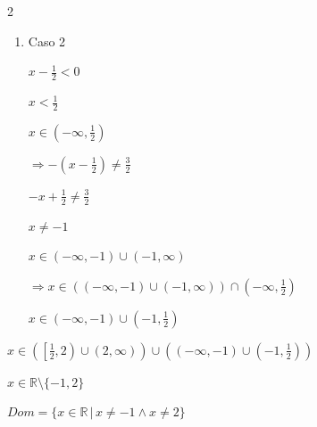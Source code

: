 \documentclass{article}
\begin{document}
\begin{enumerate}
\begin{enumerate}
\begin{multicols}{2}
\begin{enumerate}
         $x \geq \frac{1}{2}$

         $x \in \left[ \frac{1}{2}, \infty \right)$
         \vspace{\baselineskip}
         
         $\Rightarrow x - \frac{1}{2} \neq \frac{3}{2}$

         $x \neq 2$

         $x \in (-\infty, 2) \cup (2, \infty)$
         \vspace{\baselineskip}
         
         $\Rightarrow x \in \left( (-\infty, 2) \cup (2, \infty) \right) \cap \left[ \frac{1}{2}, \infty \right)$

         $x \in \left[ \frac{1}{2}, 2 \right) \cup (2, \infty)$
         \vspace{\baselineskip}
         
         \item[2.] Caso 2

         $x - \frac{1}{2} < 0$

         $x < \frac{1}{2}$

         $x \in (-\infty, \frac{1}{2})$
         \vspace{\baselineskip}

         $\Rightarrow -(x - \frac{1}{2}) \neq \frac{3}{2}$

         $-x + \frac{1}{2} \neq \frac{3}{2}$

         $x \neq -1$

         $x \in (-\infty, -1) \cup (-1, \infty)$
         \vspace{\baselineskip}
         
         $\Rightarrow x \in \left( (-\infty, -1) \cup (-1, \infty) \right) \cap (-\infty, \frac{1}{2})$

         $x \in (-\infty, -1) \cup (-1, \frac{1}{2})$
         \end{enumerate}
         \end{multicols}
         \vspace{\baselineskip}
         
         $x \in \left( \left[ \frac{1}{2}, 2 \right) \cup \left( 2, \infty \right) \right) \cup \left( \left( -\infty, -1 \right) \cup \left( -1, \frac{1}{2} \right) \right)$

         $x \in \mathbb{R} \setminus \{-1, 2\}$
         \vspace{\baselineskip}

         $Dom = \{x \in \mathbb{R} \, | \, x \neq -1 \land x \neq 2\}$
         

\end{enumerate}
\end{enumerate}
\end{document}
